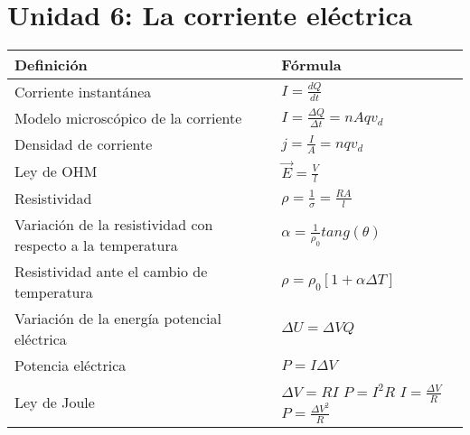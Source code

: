 \documentclass[a4paper,12pt]{article}
\begin{document}
\section{Unidad 6: La corriente eléctrica}
\renewcommand{\arraystretch}{1.5}
\begin{center}
	\begin{tabularx}{\textwidth}{|X|X|}
		\hline
		\textbf{Definición} & \textbf{Fórmula} \\ \hline
		Corriente instantánea & $I = \frac{dQ}{dt}$ \\ \hline
		Modelo microscópico de la corriente & $I = \frac{\Delta Q}{\Delta t} = nAq v_d$ \\ \hline
		Densidad de corriente & $j = \frac{I}{A} = nq v_d$ \\ \hline
		Ley de OHM & $\vec{E} = \frac{V}{l}$ \\ \hline
		Resistividad & $\rho = \frac{1}{\sigma} = \frac{R A }{l}$ \\ \hline
		Variación de la resistividad con respecto a la temperatura & $\alpha = \frac{1}{\rho_0} tang(\theta)$ \\ \hline
		Resistividad ante el cambio de temperatura & $\rho = \rho_0 [1 + \alpha \Delta T]$ \\ \hline
		Variación de la energía potencial eléctrica & $\Delta U = \Delta V Q$ \\ \hline
		Potencia eléctrica & $P = I \Delta V$ \\ \hline
		Ley de Joule & $\Delta V = R I$ \newline $P = I^2 R$ \newline $I = \frac{\Delta V}{R}$ \newline $P = \frac{{\Delta V}^2}{R}$ \\ \hline
		\end{tabularx}
\end{center}
\end{document}
